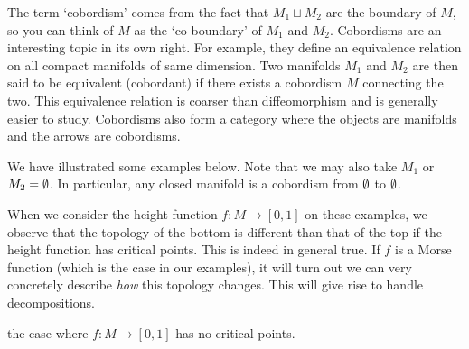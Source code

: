 The term `cobordism' comes from the fact that $M_1 \sqcup M_2$ are the boundary of $M$, so you can think of $M$ as the `co-boundary' of $M_1$ and $M_2$.
Cobordisms are an interesting topic in its own right.
For example, they define an equivalence relation on all compact manifolds of same dimension. Two manifolds $ M_1$ and $M_2$ are then said to be equivalent (cobordant) if there exists a cobordism $M$ connecting the two.
This equivalence relation is coarser than diffeomorphism and is generally easier to study.
Cobordisms also form a category where the objects are manifolds and the arrows are cobordisms.

We have illustrated some examples below.
Note that we may also take $M_1$ or $M_2 = \emptyset$.
In particular, any closed manifold is a cobordism from $\emptyset$ to $\emptyset$.
\begin{figure}[H]
    \centering
\end{figure}

When we consider the height function $f: M \to  [0, 1]$ on these examples,
we observe that the topology of the bottom is different than that of the top if the height function has critical points.
This is indeed in general true.
If $f$ is a Morse function (which is the case in our examples), it will turn out we can very concretely describe \emph{how} this topology changes.
This will give rise to handle decompositions.

 the case where $f: M \to [0, 1]$ has no critical points. 

